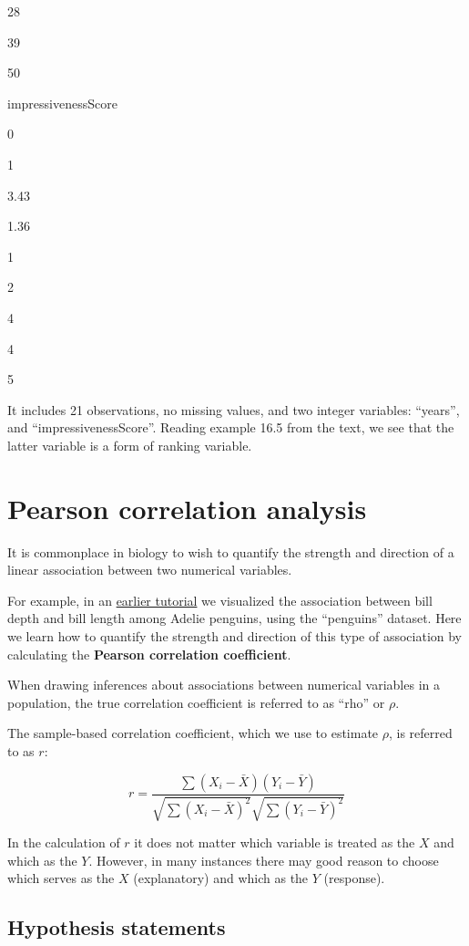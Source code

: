 \documentclass[
]{book}
\begin{document}
28

39

50

impressivenessScore

0

1

3.43

1.36

1

2

4

4

5

It includes 21 observations, no missing values, and two integer variables: ``years'', and ``impressivenessScore''. Reading example 16.5 from the text, we see that the latter variable is a form of ranking variable.

\section{Pearson correlation analysis}\label{pearson}

It is commonplace in biology to wish to quantify the strength and direction of a linear association between two numerical variables.

For example, in an \hyperref[two_numeric]{earlier tutorial} we visualized the association between bill depth and bill length among Adelie penguins, using the ``penguins'' dataset. Here we learn how to quantify the strength and direction of this type of association by calculating the \textbf{Pearson correlation coefficient}.

When drawing inferences about associations between numerical variables in a population, the true correlation coefficient is referred to as ``rho'' or \(\rho\).

The sample-based correlation coefficient, which we use to estimate \(\rho\), is referred to as \(r\):

\[r = \frac{\sum{(X_{i}-\bar{X})(Y_{i}-\bar{Y})}}{\sqrt{\sum{(X_{i}-\bar{X})^2}} {\sqrt{\sum(Y_{i}-\bar{Y})^2}}}\]

In the calculation of \(r\) it does not matter which variable is treated as the \(X\) and which as the \(Y\). However, in many instances there may good reason to choose which serves as the \(X\) (explanatory) and which as the \(Y\) (response).

\subsection{Hypothesis statements}\label{pearson_hyp}
\end{document}
